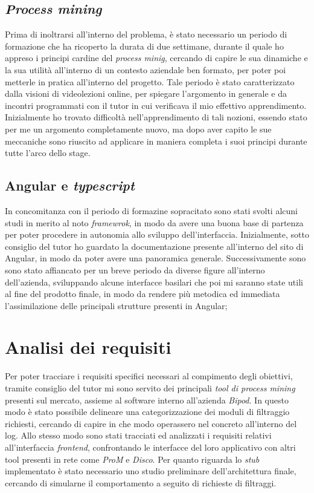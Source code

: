 \subsection{\textit{Process mining}}
Prima di inoltrarsi all'interno del problema, è stato necessario un periodo di formazione che ha ricoperto la durata di due settimane, durante il quale ho appreso i principi cardine del \textit{process minig}, cercando di capire le sua dinamiche e la sua utilità all'interno di un contesto aziendale ben formato, per poter poi metterle in pratica all'interno del progetto. Tale periodo è stato caratterizzato dalla visioni di videolezioni online, per spiegare l'argomento in generale e da incontri programmati con il tutor in cui verificava il mio effettivo apprendimento. Inizialmente ho trovato difficoltà nell'apprendimento di tali nozioni, essendo stato per me un argomento completamente nuovo, ma dopo aver capito le sue meccaniche sono riuscito ad applicare in maniera completa i suoi principi durante tutte l'arco dello stage.
\subsection{Angular e \textit{typescript}}
In concomitanza con il periodo di formazine sopracitato sono stati svolti alcuni studi in merito al noto \textit{framewrok}, in modo da avere una buona base di partenza per poter procedere in autonomia allo sviluppo dell'interfaccia. Inizialmente, sotto consiglio del tutor ho guardato la documentazione presente all'interno del sito di Angular, in modo da poter avere una panoramica generale. Successivamente sono sono stato affiancato per un breve periodo da diverse figure all'interno dell'azienda, sviluppando alcune interfacce basilari che poi mi saranno state utili al fine del prodotto finale, in modo da rendere più metodica ed immediata l'assimilazione delle principali strutture presenti in Angular;
\section{Analisi dei requisiti}
Per poter tracciare i requisiti specifici necessari al compimento degli obiettivi, tramite consiglio del tutor mi sono servito dei principali \textit{tool di process mining} presenti sul mercato, assieme al software interno all'azienda \textit{Bipod}. In questo modo è stato possibile delineare una categorizzazione dei moduli di filtraggio richiesti, cercando di capire in che modo operassero nel concreto all'interno del log. Allo stesso modo sono stati tracciati ed analizzati i requisiti relativi all'interfaccia \textit{frontend}, confrontando le interfacce del loro applicativo con altri tool presenti in rete come \textit{ProM} e \textit{\gls{Disco}}. Per quanto riguarda lo \textit{stub} implementato è stato necessario uno studio preliminare dell'architettura finale, cercando di simularne il comportamento a seguito di richieste di filtraggi. 
